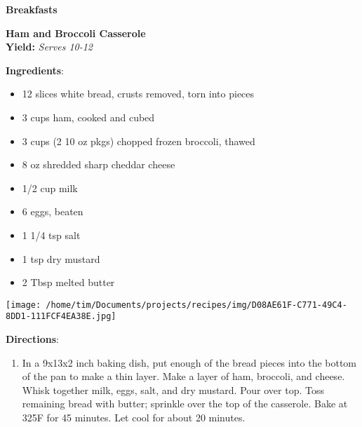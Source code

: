\documentclass[11pt, twoside, openany]{book}
\begin{document}
{\newpage \LARGE \textbf{Breakfasts}} \label{breakfasts}\vspace{4mm}\\
\noindent\begin{minipage}[t]{\linewidth}%
{\Large\textbf{Ham and Broccoli Casserole}} \label{ham-and-broccoli-casserole}\hfill\textit{}\\
\textbf{Yield:} \textit{Serves 10-12}\\
\noindent\begin{minipage}[t]{0.78\linewidth}%
\textbf{Ingredients}:\vspace{-3mm}
\begin{multicols}{2}
\begin{itemize}\setlength\itemsep{-1mm}
\item 12 slices white bread, crusts removed, torn into pieces
\item 3 cups ham, cooked and cubed
\item 3 cups (2 10 oz pkgs) chopped frozen broccoli, thawed
\item 8 oz shredded sharp cheddar cheese
\item 1/2 cup milk
\item 6 eggs, beaten
\item 1 1/4 tsp salt
\item 1 tsp dry mustard
\item 2 Tbsp melted butter
\end{itemize}
\end{multicols}
\end{minipage}
\noindent\begin{minipage}[t]{0.18\linewidth}
\centering \strut\vspace*{-\baselineskip}\newline
\texttt{[image: /home/tim/Documents/projects/recipes/img/D08AE61F-C771-49C4-8DD1-111FCF4EA38E.jpg]}\\
\end{minipage}\vspace{3mm}
\textbf{Directions}:
\vspace{-3mm}\begin{enumerate}\setlength\itemsep{-1mm}
\item In a 9x13x2 inch baking dish, put enough of the bread pieces into the bottom of the pan to make a thin layer. Make a layer of ham, broccoli, and cheese. Whisk together milk, eggs, salt, and dry mustard. Pour over top. Toss remaining bread with butter; sprinkle over the top of the casserole. Bake at 325F for 45 minutes. Let cool for about 20 minutes.
\end{enumerate}
\end{minipage}\vspace{8mm}
\end{document}
